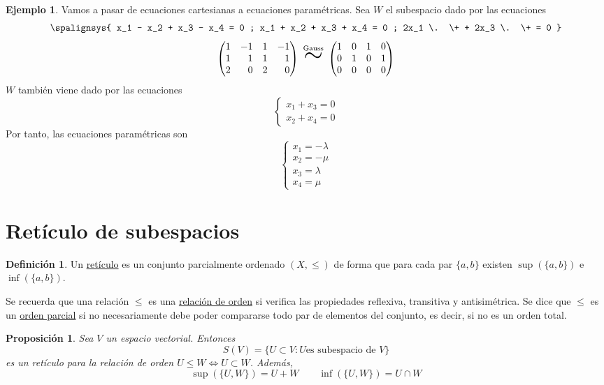 \documentclass[12pt]{report}
\newtheorem{proposition}{Proposición}[chapter]
\theoremstyle{definition}
\newtheorem{definition}{Definición}[chapter]
\theoremstyle{definition}
\newtheorem{example}{Ejemplo}[chapter]
\theoremstyle{remark}
\newcommand*{\Scale}[2][4]{\scalebox{#1}{$#2$}}%
\begin{document}
\begin{example}
Vamos a pasar de ecuaciones cartesianas a ecuaciones paramétricas. Sea $W$ el subespacio dado por las ecuaciones
\[
\spalignsys{
x_1 - x_2 + x_3 - x_4 = 0 ;
x_1 + x_2 + x_3 + x_4 = 0 ;
2x_1 \. \+ + 2x_3 \. \+ = 0
}
\]
\[
\begin{pmatrix*}[r]
    1 & -1 & 1 & -1 \\
    1 & 1 & 1 & 1 \\
    2 & 0 & 2 & 0
\end{pmatrix*}
\ \overset{\textrm{\scriptsize Gauss}}{\Scale[2.5]{\sim}} \
\begin{pmatrix*}[r]
    1 & 0 & 1 & 0 \\
    0 & 1 & 0 & 1 \\
    0 & 0 & 0 & 0
\end{pmatrix*}
\]
$W$ también viene dado por las ecuaciones
\[
\begin{cases}
    x_1+x_3=0 \\
    x_2+x_4=0
\end{cases}
\]
Por tanto, las ecuaciones paramétricas son
\[
\begin{cases}
    x_1=-\lambda \\
    x_2=-\mu \\
    x_3 = \lambda \\
    x_4 = \mu
\end{cases}
\]
\end{example}

\section{Retículo de subespacios}

\begin{definition}
    Un \ul{retículo} es un conjunto parcialmente ordenado $(X, \leq)$ de forma que para cada par $\{a,b\}$ existen $\sup(\{a,b\})$ e $\inf(\{a,b\})$.
\end{definition}

Se recuerda que una relación $\leq$ es una \ul{relación de orden} si verifica las propiedades reflexiva, transitiva y antisimétrica. Se dice que $\leq$ es un \ul{orden parcial} si no necesariamente debe poder compararse todo par de elementos del conjunto, es decir, si no es un orden total.

\begin{proposition}
Sea $V$ un espacio vectorial. Entonces
\[S(V)=\{U \subset V \colon U \textrm{es subespacio de } V\}\]
es un retículo para la relación de orden $U \leq W \iff U \subset W$. Además,
\[\sup(\{U,W\}) = U+W \qquad \inf(\{U,W\}) = U \cap W\]
\end{proposition}
\end{document}
